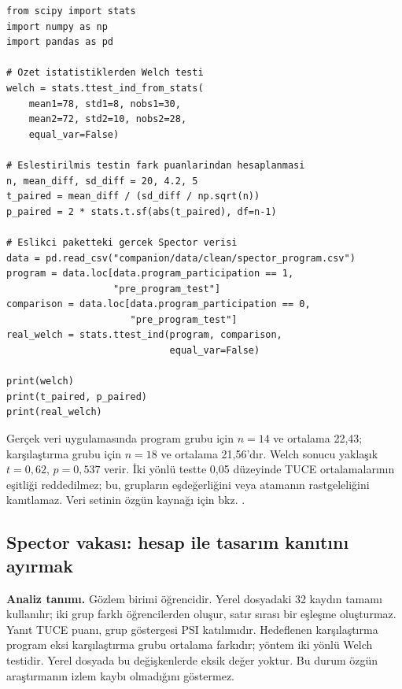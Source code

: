 \begin{softwarebox}
\begin{lstlisting}
from scipy import stats
import numpy as np
import pandas as pd

# Ozet istatistiklerden Welch testi
welch = stats.ttest_ind_from_stats(
    mean1=78, std1=8, nobs1=30,
    mean2=72, std2=10, nobs2=28,
    equal_var=False)

# Eslestirilmis testin fark puanlarindan hesaplanmasi
n, mean_diff, sd_diff = 20, 4.2, 5
t_paired = mean_diff / (sd_diff / np.sqrt(n))
p_paired = 2 * stats.t.sf(abs(t_paired), df=n-1)

# Eslikci paketteki gercek Spector verisi
data = pd.read_csv("companion/data/clean/spector_program.csv")
program = data.loc[data.program_participation == 1,
                   "pre_program_test"]
comparison = data.loc[data.program_participation == 0,
                      "pre_program_test"]
real_welch = stats.ttest_ind(program, comparison,
                             equal_var=False)

print(welch)
print(t_paired, p_paired)
print(real_welch)
\end{lstlisting}
Gerçek veri uygulamasında program grubu için $n=14$ ve ortalama 22,43;
karşılaştırma grubu için $n=18$ ve ortalama 21,56'dır. Welch sonucu yaklaşık
$t=0{,}62$, $p=0{,}537$ verir. İki yönlü testte 0,05 düzeyinde TUCE
ortalamalarının eşitliği reddedilmez; bu, grupların eşdeğerliğini veya
atamanın rastgeleliğini kanıtlamaz. Veri setinin özgün kaynağı için bkz.
\citet{spector1980}.
\end{softwarebox}

\subsection{Spector vakası: hesap ile tasarım kanıtını ayırmak}
\label{sec:spector-tasarim-vakasi}

\textbf{Analiz tanımı.} Gözlem birimi öğrencidir. Yerel dosyadaki 32 kaydın
tamamı kullanılır; iki grup farklı öğrencilerden oluşur, satır sırası bir
eşleşme oluşturmaz. Yanıt TUCE puanı, grup göstergesi PSI katılımıdır.
Hedeflenen karşılaştırma program eksi karşılaştırma grubu ortalama farkıdır;
yöntem iki yönlü Welch testidir. Yerel dosyada bu değişkenlerde eksik değer
yoktur. Bu durum özgün araştırmanın izlem kaybı olmadığını göstermez.


